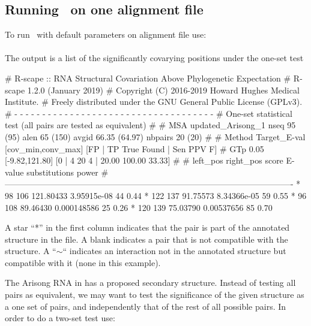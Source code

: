 \subsection{Running \rscape\, on one alignment file}
To run \rscape\ with default parameters on alignment file
 use:\\

\\

\noindent
The output is a list of the significantly covarying positions under the one-set test

\begin{sreoutput}
# R-scape :: RNA Structural Covariation Above Phylogenetic Expectation
# R-scape 1.2.0 (January 2019)
# Copyright (C) 2016-2019 Howard Hughes Medical Institute.
# Freely distributed under the GNU General Public License (GPLv3).
# - - - - - - - - - - - - - - - - - - - - - - - - - - - - - - - - - - - -
# One-set statistical test (all pairs are tested as equivalent) 
#
# MSA updated_Arisong_1 nseq 95 (95) alen 65 (150) avgid 66.35 (64.97) nbpairs 20 (20)
#
# Method Target_E-val [cov_min,conv_max] [FP | TP True Found | Sen PPV F] 
# GTp    0.05         [-9.82,121.80]     [0 | 4 20 4 | 20.00 100.00 33.33] 
#
#       left_pos       right_pos        score          E-value       substitutions      power
#-------------------------------------------------------------------------------------------------------
*	      98	     106	121.80433	3.95915e-08	44		0.44
*	     122	     137	91.75573	8.34366e-05	59		0.55
*	      96	     108	89.46430	0.000148586	25		0.26
*	     120	     139	75.03790	0.00537656	85		0.70
\end{sreoutput}
A star ``*'' in the first column indicates that the pair is part of
the annotated structure in the  file. A
blank indicates a pair that is not compatible with the structure. A
``$\sim$`` indicates an interaction not in the annotated structure but
compatible with it (none in this example).

The Arisong RNA in  has a proposed
secondary structure.  Instead of testing all pairs as equivalent, we
may want to test the significance of the given structure as a one set
of pairs, and independently that of the rest of all possible pairs.
In order to do a two-set test use:\\

\\

